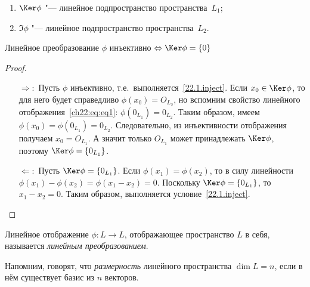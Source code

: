 \begin{stt} 
\begin{enumerate}
\item $\Ker\phi$ "--- линейное подпространство пространства~$L_1$; 
\item $\Im\phi$ "--- линейное подпространство пространства~$L_2$.
\end{enumerate}
\end{stt}
\begin{thm}
Линейное преобразование $\phi$ инъективно $\Leftrightarrow \Ker\phi=\{0\}$
\end{thm}
\begin{proof} $ $
\linebreak\vspace*{-\baselineskip}
\begin{itemize}
\item[\underline{$\Longrightarrow:$}] Пусть $\phi$ инъективно, т.е.~выполняется~\eqref{22.1.inject}. Если $x_0\in \Ker\phi$, то для него будет справедливо $\phi(x_0)=O_{L_2}$, но вспомним свойство линейного отображения~\eqref{ch22:eq:eq1}: $\phi(0_{L_1})=0_{L_2}$. Таким образом, имеем $\phi(x_0)=\phi(0_{L_1})=0_{L_2}$. Следовательно, из инъективности отображения получаем $x_0=O_{L_1}$. А значит только $O_{L_1}$ может принадлежать $\Ker\phi$, поэтому $\Ker\phi = \{0_{L_1}\}$.

\item[\underline{$\Longleftarrow:$}] 
Пусть $\Ker\phi=\{0_{L_1}\}$. Если $\phi(x_1)=\phi(x_2)$, то в силу линейности $\phi(x_1)-\phi(x_2)=\phi(x_1-x_2)=0$. Поскольку $\Ker\phi=\{0_{L_1}\}$, то $x_1-x_2=0$. Таким образом, выполняется условие~\eqref{22.1.inject}.
\end{itemize}
\vspace{-1.65\baselineskip}
\end{proof}

\begin{defn}
Линейное отображение $\phi: L\rightarrow L$, отображающее пространство $L$ в себя, называется \textit{линейным преобразованием}.
\end{defn}

Напомним, говорят, что \textit{размерность} линейного пространства $\dim L = n$, если в нём существует базис из $n$ векторов.


